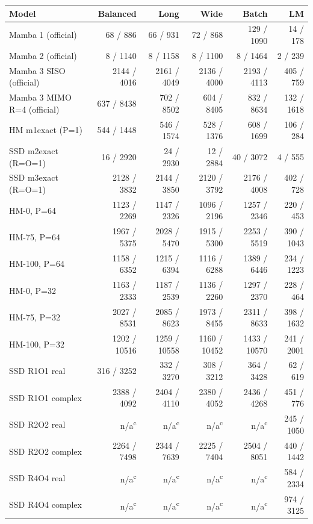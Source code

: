 \begin{tabular}{@{}lrrrrr@{}}
\toprule
Model & Balanced & Long & Wide & Batch & LM \\
\midrule
Mamba 1 (official) & 68 / 886 & 66 / 931 & 72 / 868 & 129 / 1090 & 14 / 178 \\
Mamba 2 (official) & 8 / 1140 & 8 / 1158 & 8 / 1100 & 8 / 1464 & 2 / 239 \\
Mamba 3 SISO (official) & 2144 / 4016 & 2161 / 4049 & 2136 / 4000 & 2193 / 4113 & 405 / 759 \\
Mamba 3 MIMO R=4 (official) & 637 / 8438 & 702 / 8502 & 604 / 8405 & 832 / 8634 & 132 / 1618 \\
HM m1exact (P=1) & 544 / 1448 & 546 / 1574 & 528 / 1376 & 608 / 1699 & 106 / 284 \\
SSD m2exact (R=O=1) & 16 / 2920 & 24 / 2930 & 12 / 2884 & 40 / 3072 & 4 / 555 \\
SSD m3exact (R=O=1) & 2128 / 3832 & 2144 / 3850 & 2120 / 3792 & 2176 / 4008 & 402 / 728 \\
HM-0, P=64 & 1123 / 2269 & 1147 / 2326 & 1096 / 2196 & 1257 / 2346 & 220 / 453 \\
HM-75, P=64 & 1967 / 5375 & 2028 / 5470 & 1915 / 5300 & 2253 / 5519 & 390 / 1043 \\
HM-100, P=64 & 1158 / 6352 & 1215 / 6394 & 1116 / 6288 & 1389 / 6446 & 234 / 1223 \\
HM-0, P=32 & 1163 / 2333 & 1187 / 2539 & 1136 / 2260 & 1297 / 2370 & 228 / 464 \\
HM-75, P=32 & 2027 / 8531 & 2085 / 8623 & 1973 / 8455 & 2311 / 8633 & 398 / 1632 \\
HM-100, P=32 & 1202 / 10516 & 1259 / 10558 & 1160 / 10452 & 1433 / 10570 & 241 / 2001 \\
SSD R1O1 real & 316 / 3252 & 332 / 3270 & 308 / 3212 & 364 / 3428 & 62 / 619 \\
SSD R1O1 complex & 2388 / 4092 & 2404 / 4110 & 2380 / 4052 & 2436 / 4268 & 451 / 776 \\
SSD R2O2 real & n/a\textsuperscript{c} & n/a\textsuperscript{c} & n/a\textsuperscript{c} & n/a\textsuperscript{c} & 245 / 1050 \\
SSD R2O2 complex & 2264 / 7498 & 2344 / 7639 & 2225 / 7404 & 2504 / 8051 & 440 / 1442 \\
SSD R4O4 real & n/a\textsuperscript{c} & n/a\textsuperscript{c} & n/a\textsuperscript{c} & n/a\textsuperscript{c} & 584 / 2334 \\
SSD R4O4 complex & n/a\textsuperscript{c} & n/a\textsuperscript{c} & n/a\textsuperscript{c} & n/a\textsuperscript{c} & 974 / 3125 \\
\bottomrule
\end{tabular}
